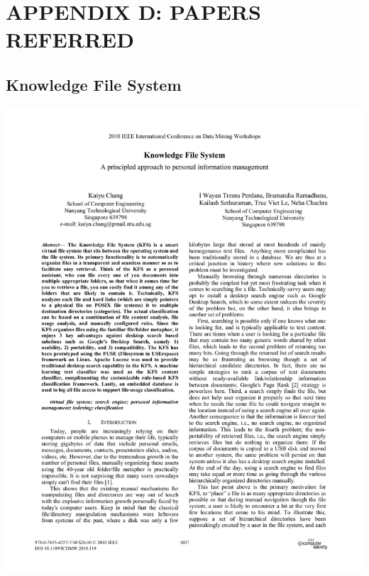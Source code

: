 \chapter*{APPENDIX D: PAPERS REFERRED}

\section{Knowledge File System}
\hspace*{-1.5cm}
\includegraphics[page=1,scale=0.75]{./appendix/KFS.pdf}


